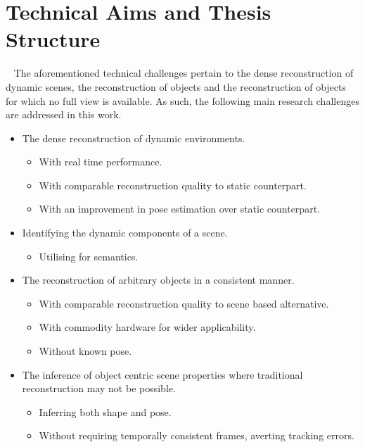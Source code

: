 \section{Technical Aims and Thesis Structure}
~\label{sec:intro_aims_structure}
The aforementioned technical challenges pertain to the dense reconstruction of dynamic scenes, the 
reconstruction of objects and the reconstruction of objects for which no full view is available. As 
such, the following main research challenges are addressed in this work.
\begin{itemize}
  \item The dense reconstruction of dynamic environments.
  \begin{itemize}
    \item With real time performance.
    \item With comparable reconstruction quality to static counterpart.
    \item With an improvement in pose estimation over static counterpart.
  \end{itemize}
  \item Identifying the dynamic components of a scene.
  \begin{itemize}
    \item Utilising for semantics.
  \end{itemize}
  \item The reconstruction of arbitrary objects in a consistent manner.
  \begin{itemize}
    \item With comparable reconstruction quality to scene based alternative.
    \item With commodity hardware for wider applicability.
    \item Without known pose.
  \end{itemize}
  \item The inference of object centric scene properties where traditional reconstruction 
may not be possible.
  \begin{itemize}
    \item Inferring both shape and pose.
    \item Without requiring temporally consistent frames, averting tracking errors.
  \end{itemize}
\end{itemize}

